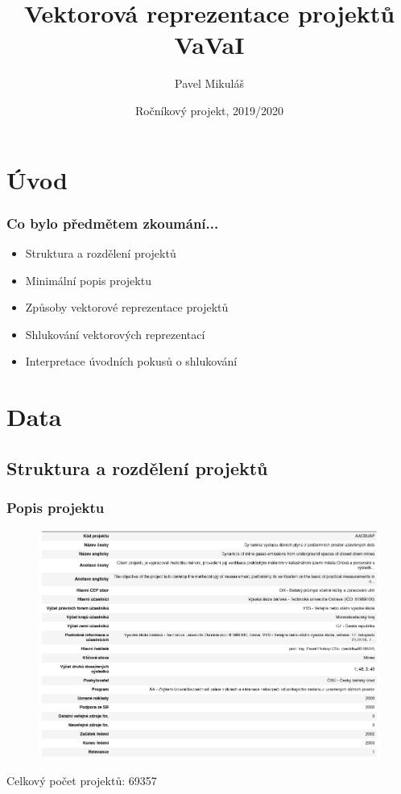 \documentclass{beamer}
\title{Vektorová reprezentace projektů VaVaI}
\author{Pavel Mikuláš}
\institute[MFF UK]%
{
  \inst{}%
  Matematicko-fyzikální fakulta\\
  Univerzita Karlova
}
\date{Ročníkový projekt, 2019/2020}
\begin{document}
\maketitle

\section{Úvod}


\begin{frame}
\frametitle{Co bylo předmětem zkoumání...}

  \begin{itemize}
    \item Struktura a rozdělení projektů \pause
    \item Minimální popis projektu \pause
    \item Způsoby vektorové reprezentace projektů \pause
    \item Shlukování vektorových reprezentací \pause
    \item Interpretace úvodních pokusů o shlukování
  \end{itemize}

\end{frame}

\section{Data}
\subsection{Struktura a rozdělení projektů}

\begin{frame}
  \frametitle{Popis projektu}

  \begin{figure}[!h]
      \centering
      \includegraphics[width=.78\textwidth,height=.8\textheight,keepaspectratio]{figures/complete_rep.png}
      \label{fig:complete_rep}
  \end{figure}
  \centering
  Celkový počet projektů: 69357
\end{frame}
\end{document}
